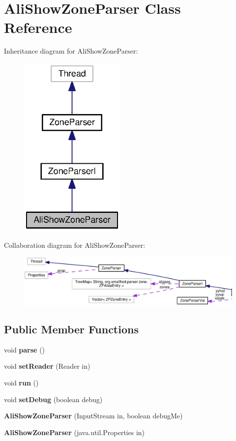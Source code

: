 \section{Ali\+Show\+Zone\+Parser Class Reference}
\label{classorg_1_1smallfoot_1_1parser_1_1zone_1_1AliShowZoneParser}


Inheritance diagram for Ali\+Show\+Zone\+Parser\+:\nopagebreak
\begin{figure}[H]
\begin{center}
\leavevmode
\includegraphics[width=148pt]{classorg_1_1smallfoot_1_1parser_1_1zone_1_1AliShowZoneParser__inherit__graph}
\end{center}
\end{figure}


Collaboration diagram for Ali\+Show\+Zone\+Parser\+:
\nopagebreak
\begin{figure}[H]
\begin{center}
\leavevmode
\includegraphics[width=350pt]{classorg_1_1smallfoot_1_1parser_1_1zone_1_1AliShowZoneParser__coll__graph}
\end{center}
\end{figure}
\subsection*{Public Member Functions}
\begin{DoxyCompactItemize}
\item 
void {\bf parse} ()
\item 
void {\bf set\+Reader} (Reader in)
\item 
void {\bf run} ()
\item 
void {\bf set\+Debug} (boolean debug)
\item 
{\bf Ali\+Show\+Zone\+Parser} (Input\+Stream in, boolean debug\+Me)
\item 
{\bf Ali\+Show\+Zone\+Parser} (java.\+util.\+Properties in)
\end{DoxyCompactItemize}

